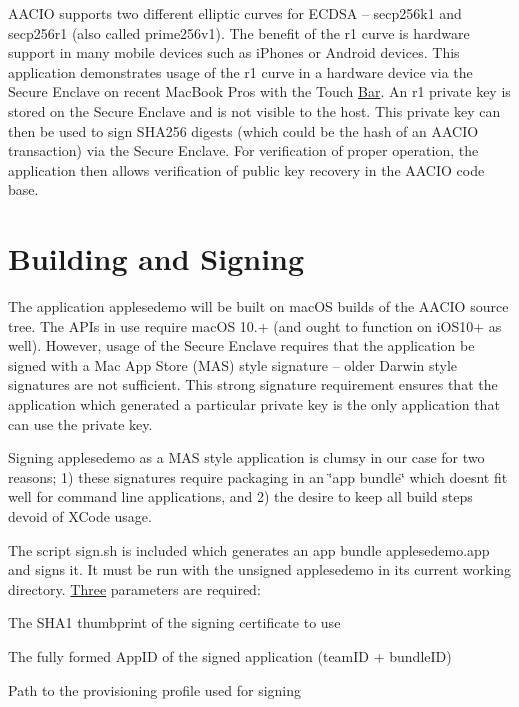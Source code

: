 A\+A\+C\+IO supports two different elliptic curves for E\+C\+D\+SA -- secp256k1 and secp256r1 (also called prime256v1). The benefit of the r1 curve is hardware support in many mobile devices such as i\+Phones or Android devices. This application demonstrates usage of the r1 curve in a hardware device via the Secure Enclave on recent Mac\+Book Pros with the Touch \mbox{\hyperlink{struct_bar}{Bar}}. An r1 private key is stored on the Secure Enclave and is not visible to the host. This private key can then be used to sign S\+H\+A256 digests (which could be the hash of an A\+A\+C\+IO transaction) via the Secure Enclave. For verification of proper operation, the application then allows verification of public key recovery in the A\+A\+C\+IO code base.

\section*{Building and Signing}

The application {\ttfamily applesedemo} will be built on mac\+OS builds of the A\+A\+C\+IO source tree. The A\+P\+Is in use require mac\+OS 10.+ (and ought to function on i\+O\+S10+ as well). However, usage of the Secure Enclave requires that the application be signed with a Mac App Store (M\+AS) style signature -- older Darwin style signatures are not sufficient. This strong signature requirement ensures that the application which generated a particular private key is the only application that can use the private key.

Signing {\ttfamily applesedemo} as a M\+AS style application is clumsy in our case for two reasons; 1) these signatures require packaging in an \char`\"{}app bundle\char`\"{} which doesn\textquotesingle{}t fit well for command line applications, and 2) the desire to keep all build steps devoid of X\+Code usage.

The script {\ttfamily sign.\+sh} is included which generates an app bundle {\ttfamily applesedemo.\+app} and signs it. It must be run with the unsigned {\ttfamily applesedemo} in its current working directory. \mbox{\hyperlink{struct_three}{Three}} parameters are required\+:
\begin{DoxyEnumerate}
\item The S\+H\+A1 thumbprint of the signing certificate to use
\end{DoxyEnumerate}
\begin{DoxyEnumerate}
\item The fully formed App\+ID of the signed application (team\+ID + bundle\+ID)
\end{DoxyEnumerate}
\begin{DoxyEnumerate}
\item Path to the provisioning profile used for signing
\end{DoxyEnumerate}

